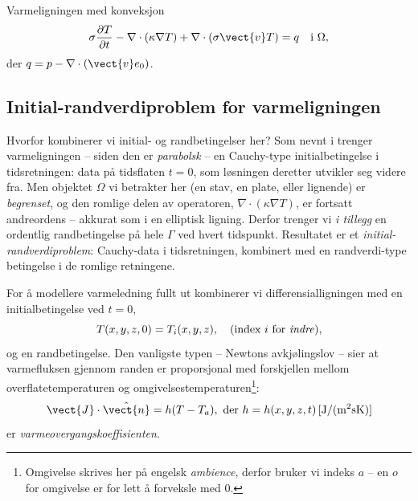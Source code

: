 \begin{oppsum}{Varmeligningen med konveksjon}
\begin{equation}
\sigma \frac{\partial T}{\partial t} - \nabla \cdot (\kappa \nabla T) + \nabla \cdot (\sigma \vect{v} T) = q \quad \text{i } \Omega,
\end{equation}
der \( q = p - \nabla \cdot (\vect{v} e_0) \).
\end{oppsum}

\subsection*{Initial-randverdiproblem for varmeligningen}

\begin{rem}{Hvorfor kombinerer vi initial- og randbetingelser her?}
Som nevnt i  trenger varmeligningen -- siden den er \emph{parabolsk} -- en Cauchy-type initialbetingelse i tidsretningen: data på tidsflaten $t=0$, som løsningen deretter utvikler seg videre fra. Men objektet $\Omega$ vi betrakter her (en stav, en plate, eller lignende) er \emph{begrenset}, og den romlige delen av operatoren, $\nabla \cdot (\kappa \nabla T)$, er fortsatt andreordens -- akkurat som i en elliptisk ligning. Derfor trenger vi \emph{i tillegg} en ordentlig randbetingelse på hele $\Gamma$ ved hvert tidspunkt. Resultatet er et \emph{initial-randverdiproblem}: Cauchy-data i tidsretningen, kombinert med en randverdi-type betingelse i de romlige retningene.
\end{rem}

For å modellere varmeledning fullt ut kombinerer vi differensialligningen med en initialbetingelse ved \( t = 0 \),
\begin{equation}
T(x,y,z, 0) = T_i(x,y,z), \quad (\text{index } i \text{ for \textit{indre}}),
\end{equation}
og en randbetingelse. Den vanligste typen -- Newtons avkjølingslov -- sier at varmefluksen gjennom randen er proporsjonal med forskjellen mellom overflatetemperaturen og omgivelsestemperaturen\footnote{Omgivelse skrives her på engelsk \textit{ambience}, derfor bruker vi indeks $a$ -- en $o$ for omgivelse er for lett å forveksle med $0$.}:
\[
\vect{J} \cdot \hat{\vect{n}} = h(T - T_a), \text{ der } h = h(x,y,z, t) \, [\mathrm{J/(m^2 s K)}]
\]
er \emph{varmeovergangskoeffisienten}.

